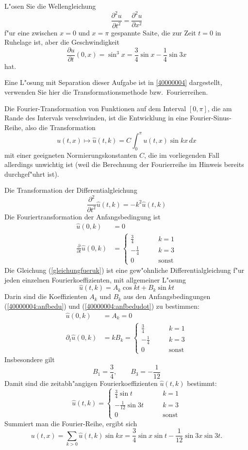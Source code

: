 L"osen Sie die Wellengleichung
\[
\frac{\partial^2 u}{\partial t^2}=\frac{\partial^2 u}{\partial x^2}
\]
f"ur eine zwischen $x=0$ und $x=\pi$ gespannte Saite,
die zur Zeit $t=0$ in Ruhelage ist, aber die Geschwindigkeit
\[
\frac{\partial u}{\partial t}(0, x)
=
\sin^3 x=\frac34\sin x-\frac14\sin 3x
\]
hat.

\begin{hinweis}
Eine L"osung mit Separation dieser Aufgabe ist in \ref{40000004}
dargestellt, verwenden Sie hier die Transformationsmethode bzw.~Fourierreihen.
\end{hinweis}

\begin{loesung}
Die Fourier-Transformation
von Funktionen auf dem Interval $[0,\pi]$, die am Rande
des Intervals verschwinden, ist die Entwicklung in eine Fourier-Sinus-Reihe,
also die Transformation 
\[u(t,x) \mapsto \hat u(t, k)= C\int_0^{\pi} u(t,x)\sin kx\, dx\]
mit einer geeigneten Normierungskonstanten $C$, die im vorliegenden
Fall allerdings unwichtig ist (weil die Berechnung der Fourierreihe
im Hinweis bereits durchgef"uhrt ist).

Die Transformation der Differentialgleichung 
\begin{equation}
\frac{\partial^2}{\partial t^2}\hat u(t,k)
=-k^2\hat u(t,k)
\label{gleichungfueruk}
\end{equation}
Die Fouriertransformation der Anfangsbedingung ist
\begin{align}
\hat u(0,k)&=0\label{40000004:anfbedu}\\
\frac{\partial}{\partial t}\hat u(0,k)&=
\begin{cases}
\frac34&\qquad k= 1\\
-\frac14&\qquad k= 3\\
0&\qquad \text{sonst}
\end{cases}
\label{40000004:anfbedudot}
\end{align}
Die Gleichung
(\ref{gleichungfueruk})
ist eine gew"ohnliche Differentialgleichung f"ur jeden
einzelnen Fourierkoeffizienten, mit allgemeiner L"osung
\[
\hat u(t,k)=A_k\cos kt+B_k\sin kt
\]
Darin sind die Koeffizienten $A_k$ und $B_k$ aus den Anfangsbedingungen
(\ref{40000004:anfbedu}) und (\ref{40000004:anfbedudot}) zu bestimmen:
\begin{align*}
\hat u(0,k)&=A_k=0\\
\partial_t \hat u(0,k)&=kB_k=
\begin{cases}
\frac34&\qquad k= 1\\
-\frac14&\qquad k= 3\\
0&\qquad \text{sonst}
\end{cases}
\end{align*}
Insbesondere gilt
\[
B_1=\frac34,\qquad B_3=-\frac1{12}
\]
Damit sind die zeitabh"angigen Fourierkoeffizienten $\hat u(t,k)$ bestimmt:
\[
\hat u(t,k)=
\begin{cases}
\frac34\sin t &\qquad k= 1\\
-\frac1{12}\sin 3t&\qquad k= 3\\
0&\qquad \text{sonst}
\end{cases}
\]
Summiert man die Fourier-Reihe, ergibt sich
\[
u(t,x)=\sum_{k>0}\hat u(t,k) \sin kx
= \frac34\sin x \sin t -\frac1{12}\sin 3x \sin 3t.
\]
\end{loesung}
